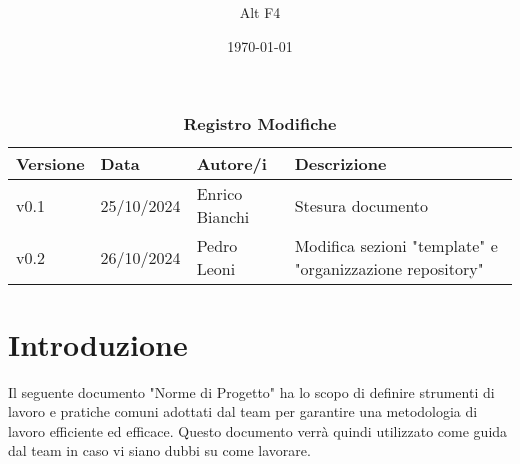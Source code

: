 \documentclass[a4paper, 12pt]{article}
\title{\Huge \textbf{\titolo}}
\author{\Large{Alt} \raisebox{0.3ex}{\normalsize  +} \Large{F4}}
\date{\today}
\def\logo{../Immagini/logo.jpeg}
\def\ultima-versione{v0.2}
\begin{document}
\begin{titlepage}      
    \maketitle
    \thispagestyle{empty}  

\end{titlepage}

\tableofcontents

\newpage

\begin{table}[!h]
    \centering
    \caption*{\textbf{\Large Registro Modifiche}}
    {\renewcommand{\arraystretch}{2}
    \begin{tabularx}{\textwidth}{| X | X | X | X |}
        \hline
            \textbf{\large Versione} & 
            \textbf{\large Data} & 
            \textbf{\large Autore/i} & 
            \textbf{\large Descrizione} \\ 
        \hline \hline
            v0.1 & 
            25/10/2024 & 
            Enrico Bianchi & 
            Stesura documento \\
        \hline 
        \ultima-versione & 
            26/10/2024 & 
            Pedro Leoni & 
            Modifica sezioni "template" e "organizzazione repository"  \\
        \hline 
    \end{tabularx}}
\end{table}

\newpage

    \section{Introduzione}
    Il seguente documento "Norme di Progetto" ha lo scopo di definire strumenti di lavoro e pratiche comuni adottati dal team per garantire una metodologia di lavoro efficiente ed efficace.
    Questo documento verrà quindi utilizzato come guida dal team in caso vi siano dubbi su come lavorare.
\end{document}
